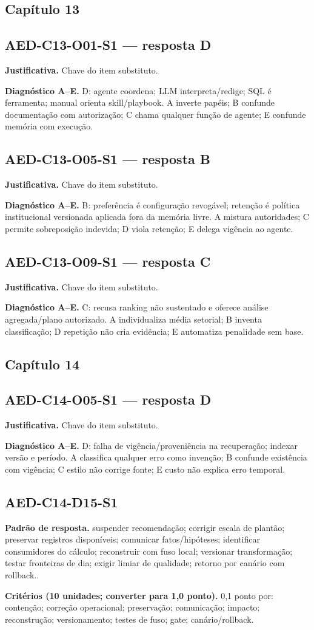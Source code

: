 \documentclass[10pt,a4paper]{article}
\newcommand{\Obj}[4]{\subsection*{#1 --- resposta #2}\textbf{Justificativa.} #3\par\smallskip\textbf{Diagnóstico A--E.} #4}
\newcommand{\Disc}[3]{\subsection*{#1}\textbf{Padrão de resposta.} #2\par\smallskip\textbf{Critérios (10 unidades; converter para 1,0 ponto).} #3}
\begin{document}
\subsection{Capítulo 13}
\Obj{AED-C13-O01-S1}{D}{Chave do item substituto.}{D: agente coordena; LLM interpreta/redige; SQL é ferramenta; manual orienta skill/playbook. A inverte papéis; B confunde documentação com autorização; C chama qualquer função de agente; E confunde memória com execução.}
\Obj{AED-C13-O05-S1}{B}{Chave do item substituto.}{B: preferência é configuração revogável; retenção é política institucional versionada aplicada fora da memória livre. A mistura autoridades; C permite sobreposição indevida; D viola retenção; E delega vigência ao agente.}
\Obj{AED-C13-O09-S1}{C}{Chave do item substituto.}{C: recusa ranking não sustentado e oferece análise agregada/plano autorizado. A individualiza média setorial; B inventa classificação; D repetição não cria evidência; E automatiza penalidade sem base.}
\subsection{Capítulo 14}
\Obj{AED-C14-O05-S1}{D}{Chave do item substituto.}{D: falha de vigência/proveniência na recuperação; indexar versão e período. A classifica qualquer erro como invenção; B confunde existência com vigência; C estilo não corrige fonte; E custo não explica erro temporal.}
\Disc{AED-C14-D15-S1}{suspender recomendação; corrigir escala de plantão; preservar registros disponíveis; comunicar fatos/hipóteses; identificar consumidores do cálculo; reconstruir com fuso local; versionar transformação; testar fronteiras de dia; exigir limiar de qualidade; retorno por canário com rollback..}{0,1 ponto por: contenção; correção operacional; preservação; comunicação; impacto; reconstrução; versionamento; testes de fuso; gate; canário/rollback.}
\end{document}
